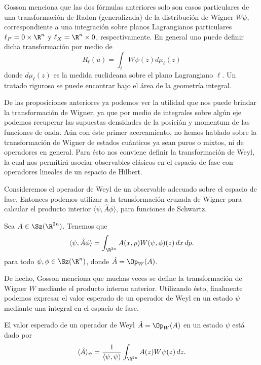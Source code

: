   Gosson menciona que las dos fórmulas anteriores solo son
  casos particulares de una transformación de Radon
  (generalizada) de la distribución de Wigner $W\psi$,
  correspondiente a una integración sobre planos
  Lagrangianos particulares $\ell_P = 0 \times \R^{n}$ y
  $\ell_X = \R^{n} \times 0$, respectivamente. En general
  uno puede definir dicha transformación por medio de
  \[
    R_{\ell}(u)
    = \int_{\ell} W\psi(z) d\mu_{\ell}(z)
  \] 
  donde $d\mu_{\ell}(z)$ es la medida euclideana sobre el
  plano Lagrangiano $\ell$. Un tratado riguroso se puede
  encontrar bajo el área de la geometría integral.

  De las proposiciones anteriores ya podemos ver la utilidad
  que nos puede brindar la transformación de Wigner, ya que
  por medio de integrales sobre algún eje podemos recuperar
  las supuestas densidades de la posición y momentum de las
  funciones de onda. Aún con éste primer acercamiento, no
  hemos hablado sobre la transformación de Wigner de estados
  cuánticos ya sean puros o mixtos, ni de operadores en
  general. Para ésto nos conviene definir la transformación
  de Weyl, la cual nos permitirá asociar observables
  clásicos en el espacio de fase con operadores lineales de
  un espacio de Hilbert.

  Consideremos el operador de Weyl de un observable adecuado
  sobre el espacio de fase. Entonces podemos utilizar a la
  transformación cruzada de Wigner para calcular el producto
  interior $\langle \psi, \hat{A}\phi \rangle$, para
  funciones de Schwartz.
  \begin{proposition}
    \label{prop:wigner-weyl}
    Sea $A \in \Sz(\R^{2n})$. Tenemos que
    \begin{equation}
      \langle \psi, \hat{A}\phi \rangle
      = \int_{\R^{2n}} A(x,p)W(\psi,\phi)(z) \, dx \, dp.
    \end{equation}
    para todo $\psi, \phi \in \Sz(\R^{n})$, donde $\hat{A} =
    \Op_W(A)$.
  \end{proposition}
  De hecho, Gosson menciona que muchas veces se define la
  transformación de Wigner $W$ mediante el producto interno
  anterior. Utilizando ésto, finalmente podemos expresar el
  valor esperado de un operador de Weyl en un estado $\psi$
  mediante una integral en el espacio de fase.
  \begin{proposition}
    El valor esperado de un operador de Weyl $\hat{A} =
    \Op_W(A)$ en un estado $\psi$ está dado por
    \begin{equation}
      \langle \hat{A} \rangle_\psi
      = \frac{1}{\langle \psi, \psi \rangle} 
      \int_{\R^{2n}} A(z) W\psi(z) \, dz.
    \end{equation}
  \end{proposition}  

